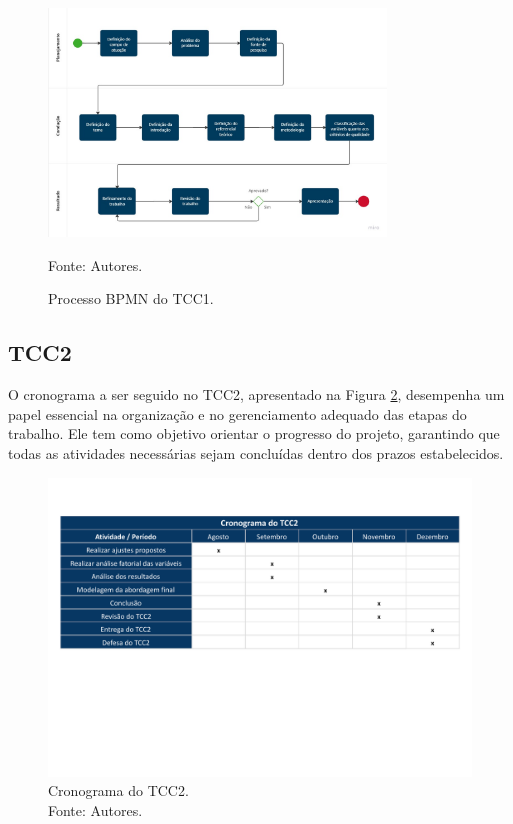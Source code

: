 \begin{figure}[H]
    \centering
    \includegraphics[width=0.8\textwidth]{figuras/bpmn1.jpg}
    \caption{Processo BPMN do TCC1.}
    \small Fonte: Autores.
    \label{fig:bpmn1}
\end{figure}

\subsection{TCC2}

O cronograma a ser seguido no TCC2, apresentado na Figura \ref{fig:cronograma_tcc2}, desempenha um papel essencial na organização e no gerenciamento adequado das etapas do trabalho. Ele tem como objetivo orientar o progresso do projeto, garantindo que todas as atividades necessárias sejam concluídas dentro dos prazos estabelecidos.

\vspace{-40pt}
\begin{figure}[H]
    \centering
    \includegraphics[width=1.0\textwidth]{figuras/cronograma_tcc2.pdf}
    \vspace{-150pt}
    \caption{Cronograma do TCC2.\\
    Fonte: Autores.}
    \label{fig:cronograma_tcc2}
\end{figure}

